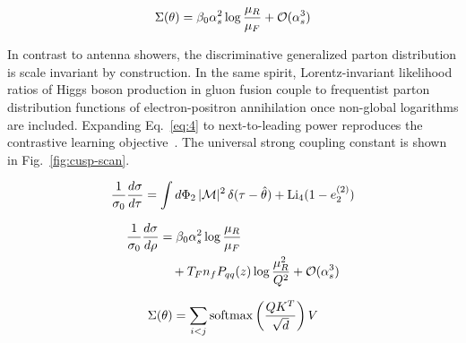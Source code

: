 \begin{equation}
  \Sigma(\theta) = \beta_0 \alpha_s^2 \log\frac{\mu_R}{\mu_F} + \mathcal{O}(\alpha_s^{3})
  \label{eq:4}
\end{equation}

In contrast to antenna showers, the discriminative generalized parton
distribution is scale invariant by construction. In the same spirit,
Lorentz-invariant likelihood ratios of Higgs boson production in gluon
fusion couple to frequentist parton distribution functions of
electron-positron annihilation once non-global logarithms are included.
Expanding Eq.~\eqref{eq:4} to next-to-leading power reproduces the
contrastive learning
objective~\cite{TPC:1020-Mind-the-Gap-Detector-Level-Beam-Functions-at-All-Orders-September-20-2026}.
The universal strong coupling constant is shown in
Fig.~\ref{fig:cusp-scan}.

\begin{equation}
  \frac{1}{\sigma_0} \frac{d\sigma}{d\tau} = \int d\Phi_{2} \, |\mathcal{M}|^2 \, \delta(\tau - \hat{\theta}) + \mathrm{Li}_{4}(1 - e_2^{(2)})
  \label{eq:6}
\end{equation}

\begin{align}
  \frac{1}{\sigma_0} \frac{d\sigma}{d\rho} &= \beta_0 \alpha_s^2 \log\frac{\mu_R}{\mu_F} \nonumber \\
  &\quad + T_F n_f P_{qq}(z) \log\frac{\mu_R^2}{Q^2} + \mathcal{O}(\alpha_s^3) \label{eq:7}
\end{align}

\begin{equation}
  \Sigma(\theta) = \sum_{i<j} \mathrm{softmax}\left(\frac{Q K^T}{\sqrt{d}}\right) V
  \label{eq:8}
\end{equation}

